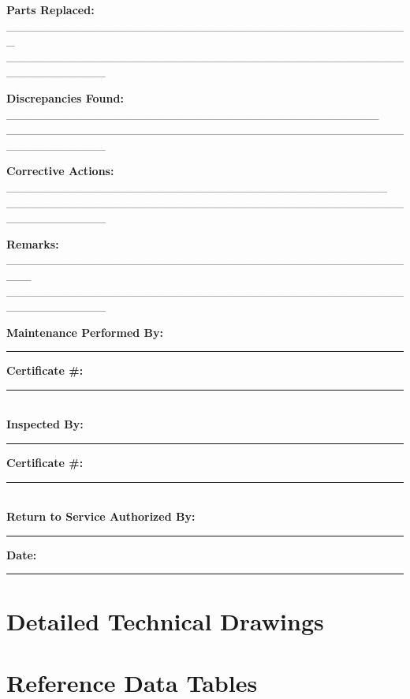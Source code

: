 \documentclass[12pt,a4paper,twoside,openright]{book}
\begin{document}
\begin{center}
{{\textbf{Parts Replaced:} \_\_\_\_\_\_\_\_\_\_\_\_\_\_\_\_\_\_\_\_\_\_\_\_\_\_\_\_\_\_\_\_\_\_\_\_\_\_\_\_\_\_\_\_\_\_\_\_\_\\
\_\_\_\_\_\_\_\_\_\_\_\_\_\_\_\_\_\_\_\_\_\_\_\_\_\_\_\_\_\_\_\_\_\_\_\_\_\_\_\_\_\_\_\_\_\_\_\_\_\_\_\_\_\_\_\_\_\_\_\_

\textbf{Discrepancies Found:} \_\_\_\_\_\_\_\_\_\_\_\_\_\_\_\_\_\_\_\_\_\_\_\_\_\_\_\_\_\_\_\_\_\_\_\_\_\_\_\_\_\_\_\_\_\\
\_\_\_\_\_\_\_\_\_\_\_\_\_\_\_\_\_\_\_\_\_\_\_\_\_\_\_\_\_\_\_\_\_\_\_\_\_\_\_\_\_\_\_\_\_\_\_\_\_\_\_\_\_\_\_\_\_\_\_\_

\textbf{Corrective Actions:} \_\_\_\_\_\_\_\_\_\_\_\_\_\_\_\_\_\_\_\_\_\_\_\_\_\_\_\_\_\_\_\_\_\_\_\_\_\_\_\_\_\_\_\_\_\_\\
\_\_\_\_\_\_\_\_\_\_\_\_\_\_\_\_\_\_\_\_\_\_\_\_\_\_\_\_\_\_\_\_\_\_\_\_\_\_\_\_\_\_\_\_\_\_\_\_\_\_\_\_\_\_\_\_\_\_\_\_

\textbf{Remarks:} \_\_\_\_\_\_\_\_\_\_\_\_\_\_\_\_\_\_\_\_\_\_\_\_\_\_\_\_\_\_\_\_\_\_\_\_\_\_\_\_\_\_\_\_\_\_\_\_\_\_\_\\
\_\_\_\_\_\_\_\_\_\_\_\_\_\_\_\_\_\_\_\_\_\_\_\_\_\_\_\_\_\_\_\_\_\_\_\_\_\_\_\_\_\_\_\_\_\_\_\_\_\_\_\_\_\_\_\_\_\_\_\_

\vspace{0.5cm}
\textbf{Maintenance Performed By:} \rule{5cm}{0.4pt} \hspace{0.5cm} \textbf{Certificate \#:} \rule{3cm}{0.4pt}\\
\vspace{0.3cm}
\textbf{Inspected By:} \rule{5cm}{0.4pt} \hspace{0.5cm} \textbf{Certificate \#:} \rule{3cm}{0.4pt}\\
\vspace{0.3cm}
\textbf{Return to Service Authorized By:} \rule{5cm}{0.4pt} \hspace{0.5cm} \textbf{Date:} \rule{3cm}{0.4pt}
}}
\end{center}

\section{Detailed Technical Drawings}
\lipsum[68] %

\section{Reference Data Tables}
\lipsum[69] %
\end{document}
